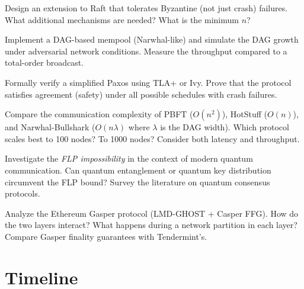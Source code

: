 \begin{exercise}[Challenge]
Design an extension to Raft that tolerates Byzantine (not just crash) failures. What additional mechanisms are needed? What is the minimum $n$?
\end{exercise}

\begin{exercise}[Challenge]
Implement a DAG-based mempool (Narwhal-like) and simulate the DAG growth under adversarial network conditions. Measure the throughput compared to a total-order broadcast.
\end{exercise}

\begin{exercise}[Challenge]
Formally verify a simplified Paxos using TLA+ or Ivy. Prove that the protocol satisfies agreement (safety) under all possible schedules with crash failures.
\end{exercise}

\begin{exercise}[Research]
Compare the communication complexity of PBFT ($O(n^2)$), HotStuff ($O(n)$), and Narwhal-Bullshark ($O(n\lambda)$ where $\lambda$ is the DAG width). Which protocol scales best to 100 nodes? To 1000 nodes? Consider both latency and throughput.
\end{exercise}

\begin{exercise}[Research]
Investigate the \emph{FLP impossibility} in the context of modern quantum communication. Can quantum entanglement or quantum key distribution circumvent the FLP bound? Survey the literature on quantum consensus protocols.
\end{exercise}

\begin{exercise}[Research]
Analyze the Ethereum Gasper protocol (LMD-GHOST + Casper FFG). How do the two layers interact? What happens during a network partition in each layer? Compare Gasper finality guarantees with Tendermint's.
\end{exercise}

\section{Timeline}
\label{sec:consensus:timeline}

